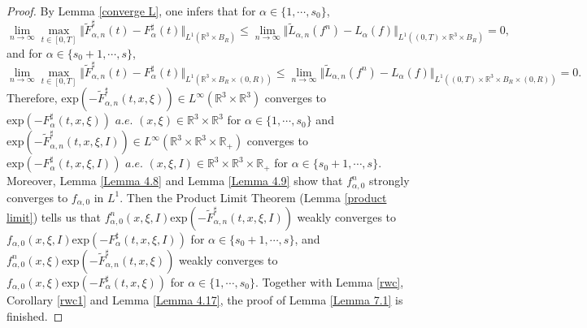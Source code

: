 \documentclass[reqno,11pt]{amsart}
\numberwithin{equation}{section}
\def\R{\mathbb{R}}
\def\exp{\mathrm{exp}}
\begin{document}
\begin{proof}
	  By Lemma \ref{converge L}, one infers that for $\alpha \in \{1,\cdots,s_0\}$, 
	\begin{equation*}
	\lim \limits_{n \rightarrow \infty}	\max \limits_{t\in [0,T]} \Vert \tilde{F}^\sharp _{\alpha ,n} (t)- F^\sharp _\alpha (t)\Vert_{L^1(\R^3 \times B_R )} \leq \lim \limits_{n \rightarrow \infty} \Vert \tilde{L}_{\alpha ,n}(f^n) -L_\alpha(f) \Vert_{L^1((0,T)\times \R^3 \times B_R)} = 0 ,
	\end{equation*}
and for $\alpha \in \{s_0+1,\cdots,s\}$,
	\begin{equation*}
		\lim \limits_{n \rightarrow \infty}	\max \limits_{t\in [0,T]} \Vert \tilde{F}^\sharp _{\alpha ,n} (t)- F^\sharp_\alpha(t)\Vert_{L^1(\R^3 \times B_R \times (0,R))} \leq \lim \limits_{n \rightarrow \infty} \Vert \tilde{L}_{\alpha ,n}(f^n) -L_\alpha(f) \Vert_{L^1((0,T)\times \R^3 \times B_R\times (0,R))} = 0.
	\end{equation*}
Therefore, $\exp(-\tilde{F}^\sharp _{\alpha ,n } (t,x,\xi )) \in L^\infty ( \R^3 \times \R^3 )$ converges to $\exp(-F^\sharp _{\alpha} (t,x,\xi ))$ $a.e.$ $(x, \xi) \in \R^3 \times \R^3 $ for $\alpha \in \{1,\cdots,s_0\}$ and $\exp(-\tilde{F}^\sharp _{\alpha ,n } (t,x,\xi ,I)) \in L^\infty (\R^3 \times \R^3 \times \R_+)$ converges to $\exp(-F^\sharp _{\alpha} (t,x,\xi ,I))$ $a.e.$ $(x, \xi, I) \in \R^3 \times \R^3 \times \R_+$ for $\alpha \in \{s_0+1,\cdots,s\}$. Moreover, Lemma \ref{Lemma 4.8} and Lemma \ref{Lemma 4.9} show that $f^n_{\alpha, 0}$ strongly converges to $f_{\alpha, 0}$ in $L^1$. Then the Product Limit Theorem (Lemma \ref{product limit}) tells us that $ f^n_{\alpha ,0} (x,\xi ,I )\exp(-\tilde{F}^\sharp _{\alpha ,n } (t,x,\xi ,I)) $ weakly converges to $f_{\alpha ,0} (x,\xi ,I )\exp(- F^\sharp_{\alpha } (t,x,\xi ,I))$ for $\alpha \in \{ s_0 + 1, \cdots, s \}$, and $ f^n_{\alpha ,0} (x,\xi )\exp(-\tilde{F}^\sharp _{\alpha ,n } (t,x,\xi )) $ weakly converges to $f_{\alpha ,0} (x,\xi )\exp(- F^\sharp_{\alpha } (t,x,\xi))$ for $\alpha \in \{  1, \cdots, s_0 \}$. Together with Lemma \ref{rwc}, Corollary \ref{rwc1} and Lemma \ref{Lemma 4.17}, the proof of Lemma \ref{Lemma 7.1} is finished.
\end{proof}
\end{document}
